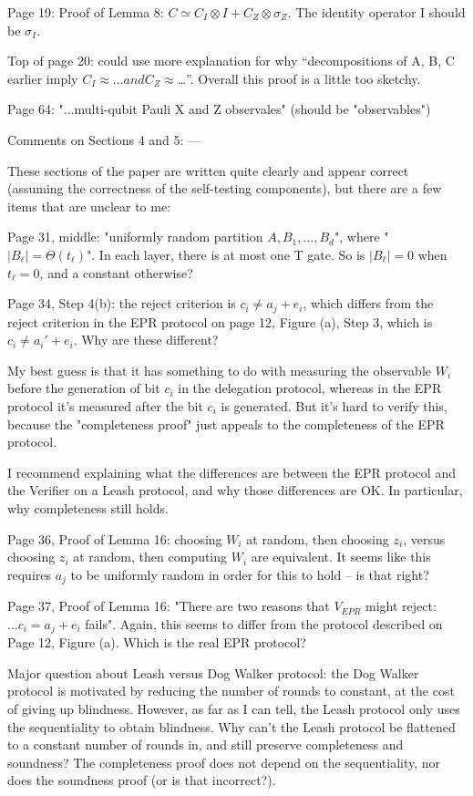 \documentclass[12pt]{article}
\begin{document}
Page 19: Proof of Lemma 8: $C \simeq C_I \otimes I + C_Z \otimes \sigma_Z$. The identity operator I should be $\sigma_I$. 

Top of page 20: could use more explanation for why “decompositions of A, B, C earlier imply $C_I \approx… and C_Z \approx$…”. Overall this proof is a little too sketchy.

Page 64: "...multi-qubit Pauli X and Z observales" (should be "observables")


Comments on Sections 4 and 5:
---

These sections of the paper are written quite clearly and appear correct (assuming the correctness of the self-testing components), but there are a few items that are unclear to me:

Page 31, middle: "uniformly random partition $A, B_1,..., B_d$", where "$|B_\ell| = \Theta(t_\ell)$". In each layer, there is at most one T gate. So is $|B_\ell| = 0$ when $t_\ell = 0$, and a constant otherwise?

Page 34, Step 4(b): the reject criterion is $c_i \neq a_j + e_i$, which differs from the reject criterion in the EPR protocol on page 12, Figure (a), Step 3, which is $c_i \neq a_i' + e_i$. Why are these different?

My best guess is that it has something to do with measuring the observable $W_i$ before the generation of bit $c_i$ in the delegation protocol, whereas in the EPR protocol it's measured after the bit $c_i$ is generated. But it's hard to verify this, because the "completeness proof" just appeals to the completeness of the EPR protocol.

I recommend explaining what the differences are between the EPR protocol and the Verifier on a Leash protocol, and why those differences are OK. In particular, why completeness still holds.

Page 36, Proof of Lemma 16: choosing $W_i$ at random, then choosing $z_i$, versus choosing $z_i$ at random, then computing $W_i$ are equivalent. It seems like this requires $a_j$ to be uniformly random in order for this to hold -- is that right?

Page 37, Proof of Lemma 16: "There are two reasons that $V_{EPR}$ might reject: $... c_i = a_j + e_i$ fails". Again, this seems to differ from the protocol described on Page 12, Figure (a). Which is the real EPR protocol?

Major question about Leash versus Dog Walker protocol: the Dog Walker protocol is motivated by reducing the number of rounds to constant, at the cost of giving up blindness. However, as far as I can tell, the Leash protocol only uses the sequentiality to obtain blindness. Why can't the Leash protocol be flattened to a constant number of rounds in, and still preserve completeness and soundness? The completeness proof does not depend on the sequentiality, nor does the soundness proof (or is that incorrect?).
\end{document}
